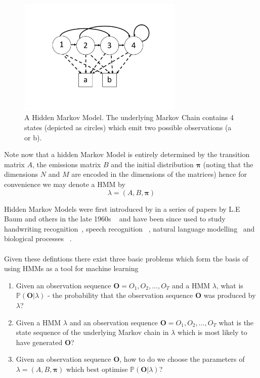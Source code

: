 \begin{figure}[]
  \centering
    \includegraphics[width=0.7\textwidth]{ThesisFigs/HMMExample}
  \caption{A Hidden Markov Model. The underlying Markov Chain contains 4 states (depicted as circles) which emit two possible observations (a or b).}\label{fig:hmmex}
\end{figure}


Note now that a hidden Markov Model is entirely determined by the transition matrix $A$, the emissions matrix $B$ and the initial distribution $\bm{\pi}$ (noting that the dimensions $N$ and $M$ are encoded in the dimensions of the matrices) hence for convenience we may denote a HMM by
\begin{equation*}
\lambda = (A,B, \bm{\pi})
\end{equation*}

Hidden Markov Models were first introduced by in a series of papers by L.E Baum and others in the late 1960s ~\citep{baum1966statistical,baum1970maximization} and have been since used to study handwriting recognition~\citep{bunke1995off}, speech recognition ~\citep{juang1991hidden, jelinek1998statistical}, natural language modelling~\citep{manning1999foundations, jurafsky2002speech} and biological processes ~\citep{krogh1994hidden, durbin1998biological, lio1998models}.
\\
\\
Given these defintions there exist three basic problems which form the basis of using HMMs as a tool for machine learning
\begin{enumerate}
\item Given an observation sequence $\bm{O} = O_1,O_2,\dots,O_T$ and a HMM $\lambda$, what is $\mathbb{P}(\bm{O}|\lambda)$ - the probability that the observation sequence $\bm{O}$ was produced by $\lambda$?
\item Given a HMM $\lambda$ and an observation sequence $\bm{O} = O_1,O_2,\dots,O_T $ what is the state sequence of the underlying Markov chain in $\lambda$ which is most likely to have generated $\bm{O}$?
\item Given an observation sequence $\bm{O}$, how to do we choose the parameters of $\lambda = (A,B,\bm{\pi})$ which best optimise $\mathbb{P}(\bm{O}|\lambda)$?
\end{enumerate}

